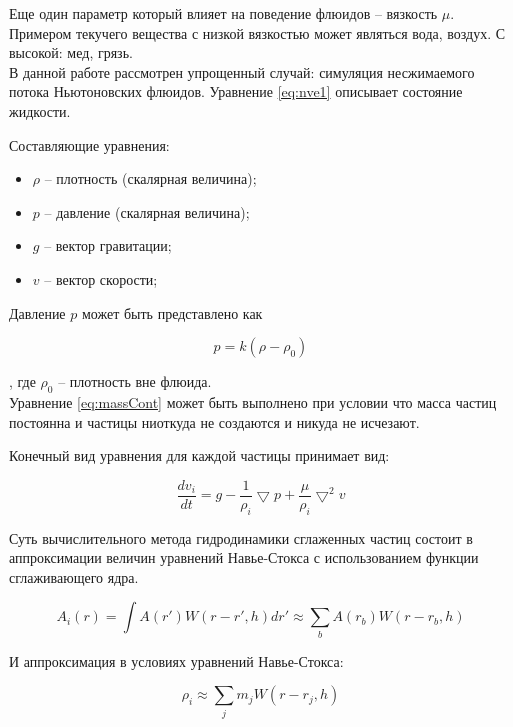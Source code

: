 Еще один параметр который влияет на поведение флюидов -- вязкость $\mu$.
Примером текучего вещества с низкой вязкостью может являться вода, воздух.
С высокой: мед, грязь. \\

В данной работе рассмотрен упрощенный случай: симуляция несжимаемого потока
Ньютоновских флюидов. Уравнение \eqref{eq:nve1} описывает состояние жидкости.

Составляющие уравнения:

\begin{itemize}
  \item $\rho$ -- плотность (скалярная величина);
  \item $p$ -- давление (скалярная величина);
  \item $g$ -- вектор гравитации;
  \item $v$ -- вектор скорости;
\end{itemize}

Давление $p$ может быть представлено как

\begin{equation}
\label{eq:pressure}
  p = k(\rho - \rho_0)
\end{equation}

, где $\rho_0$ -- плотность вне флюида. \\

Уравнение \eqref{eq:massCont} может быть выполнено при условии что масса частиц
постоянна и частицы ниоткуда не создаются и никуда не исчезают.

Конечный вид уравнения для каждой частицы принимает вид:

\begin{equation}
\label{eq:}
\frac{dv_i}{dt} = g - \frac{1}{\rho_i}\bigtriangledown{}p + \frac{\mu}{\rho_i}\bigtriangledown^2v
\end{equation}

Суть вычислительного метода гидродинамики сглаженных частиц состоит в аппроксимации величин
уравнений Навье-Стокса с использованием функции сглаживающего ядра.

\begin{equation}
\label{eq:mon1992}
A_i(r) = \int{}A(r')W(r - r', h)dr' \approx \sum_{b}A(r_b)W(r - r_b, h)
\end{equation}

И аппроксимация в условиях уравнений Навье-Стокса:

\begin{equation}
\label{eq:}
  \rho_i \approx \sum_{j}m_jW(r - r_j, h)
\end{equation}

